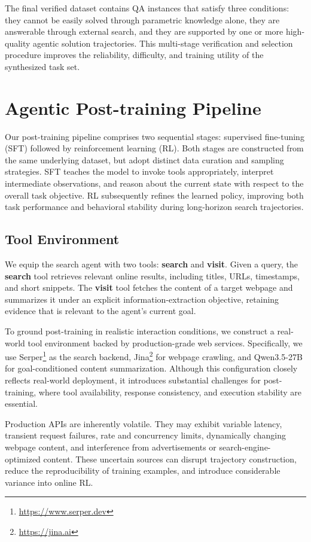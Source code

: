 \documentclass{huawei}
\begin{document}
The final verified dataset contains QA instances that satisfy three conditions: they cannot be easily solved through parametric knowledge alone, they are answerable through external search, and they are supported by one or more high-quality agentic solution trajectories. This multi-stage verification and selection procedure improves the reliability, difficulty, and training utility of the synthesized task set.



\section{Agentic Post-training Pipeline}
Our post-training pipeline comprises two sequential stages: supervised fine-tuning (SFT) followed by reinforcement learning (RL). Both stages are constructed from the same underlying dataset, but adopt distinct data curation and sampling strategies. SFT teaches the model to invoke tools appropriately, interpret intermediate observations, and reason about the current state with respect to the overall task objective. RL subsequently refines the learned policy, improving both task performance and behavioral stability during long-horizon search trajectories.


\subsection{Tool Environment}
We equip the search agent with two tools: \textbf{search} and \textbf{visit}. Given a query, the \textbf{search} tool retrieves relevant online results, including titles, URLs, timestamps, and short snippets. The \textbf{visit} tool fetches the content of a target webpage and summarizes it under an explicit information-extraction objective, retaining evidence that is relevant to the agent's current goal.


To ground post-training in realistic interaction conditions, we construct a real-world tool environment backed by production-grade web services. Specifically, we use Serper\footnote{\url{https://www.serper.dev}} as the search backend, Jina\footnote{\url{https://jina.ai}} for webpage crawling, and Qwen3.5-27B for goal-conditioned content summarization. Although this configuration closely reflects real-world deployment, it introduces substantial challenges for post-training, where tool availability, response consistency, and execution stability are essential.


Production APIs are inherently volatile. They may exhibit variable latency, transient request failures, rate and concurrency limits, dynamically changing webpage content, and interference from advertisements or search-engine-optimized content. These uncertain sources can disrupt trajectory construction, reduce the reproducibility of training examples, and introduce considerable variance into online RL.
\end{document}
